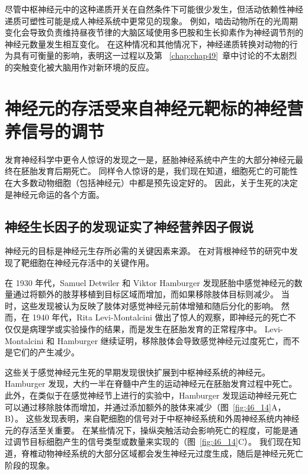 尽管中枢神经元中的这种递质开关在自然条件下可能很少发生，但活动依赖性神经递质可塑性可能是成人神经系统中更常见的现象。
例如，啮齿动物所在的光周期变化会导致负责维持昼夜节律的大脑区域使用多巴胺和生长抑素作为神经调节剂的神经元数量发生相互变化。
在这种情况和其他情况下，神经递质转换对动物的行为具有可衡量的影响，表明这一过程以及第 ~\ref{chap:chap49}~章中讨论的不太剧烈的突触变化被大脑用作对新环境的反应。



\section{神经元的存活受来自神经元靶标的神经营养信号的调节}

发育神经科学中更令人惊讶的发现之一是，胚胎神经系统中产生的大部分神经元最终在胚胎发育后期死亡。
同样令人惊讶的是，我们现在知道，细胞死亡的可能性在大多数动物细胞（包括神经元）中都是预先设定好的。
因此，关于生死的决定是神经元命运的各个方面。



\subsection{神经生长因子的发现证实了神经营养因子假说}

神经元的目标是神经元生存所必需的关键因素来源。
在对背根神经节的研究中发现了靶细胞在神经元存活中的关键作用。


在 1930 年代，Samuel Detwiler 和 Viktor Hamburger 发现胚胎中感觉神经元的数量通过将额外的肢芽移植到目标区域而增加，而如果移除肢体目标则减少。
当时，这些发现被认为反映了肢体对感觉神经元前体增殖和随后分化的影响。
然而，在 1940 年代，Rita Levi-Montalcini 做出了惊人的观察，即神经元的死亡不仅仅是病理学或实验操作的结果，而是发生在胚胎发育的正常程序中。
Levi-Montalcini 和 Hamburger 继续证明，移除肢体会导致感觉神经元过度死亡，而不是它们的产生减少。


这些关于感觉神经元生死的早期发现很快扩展到中枢神经系统的神经元。
Hamburger 发现，大约一半在脊髓中产生的运动神经元在胚胎发育过程中死亡。
此外，在类似于在感觉神经节上进行的实验中，Hamburger 发现运动神经元死亡可以通过移除肢体而增加，并通过添加额外的肢体来减少（图~\ref{fig:46_14}A，B）。
这些发现表明，来自靶细胞的信号对于中枢神经系统和外周神经系统内神经元的存活至关重要。
在某些情况下，操纵突触活动会影响死亡的程度，可能是通过调节目标细胞产生的信号类型或数量来实现的（图~\ref{fig:46_14}C）。
我们现在知道，脊椎动物神经系统的大部分区域都会发生神经元过度生成，随后是神经元死亡阶段的现象。



